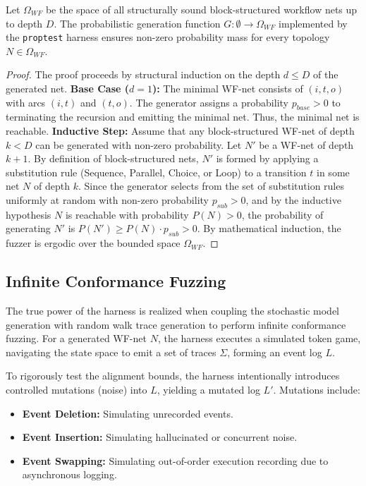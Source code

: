 \begin{theorem}
Let $\Omega_{WF}$ be the space of all structurally sound block-structured workflow nets up to depth $D$. The probabilistic generation function $G: \emptyset \rightarrow \Omega_{WF}$ implemented by the \texttt{proptest} harness ensures non-zero probability mass for every topology $N \in \Omega_{WF}$.
\end{theorem}

\begin{proof}
The proof proceeds by structural induction on the depth $d \le D$ of the generated net.
\textbf{Base Case ($d=1$):} The minimal WF-net consists of $(i, t, o)$ with arcs $(i,t)$ and $(t,o)$. The generator assigns a probability $p_{base} > 0$ to terminating the recursion and emitting the minimal net. Thus, the minimal net is reachable.
\textbf{Inductive Step:} Assume that any block-structured WF-net of depth $k < D$ can be generated with non-zero probability. Let $N'$ be a WF-net of depth $k+1$. By definition of block-structured nets, $N'$ is formed by applying a substitution rule (Sequence, Parallel, Choice, or Loop) to a transition $t$ in some net $N$ of depth $k$. Since the generator selects from the set of substitution rules uniformly at random with non-zero probability $p_{sub} > 0$, and by the inductive hypothesis $N$ is reachable with probability $P(N) > 0$, the probability of generating $N'$ is $P(N') \ge P(N) \cdot p_{sub} > 0$. By mathematical induction, the fuzzer is ergodic over the bounded space $\Omega_{WF}$.
\end{proof}

\subsection{Infinite Conformance Fuzzing}

The true power of the harness is realized when coupling the stochastic model generation with random walk trace generation to perform infinite conformance fuzzing. For a generated WF-net $N$, the harness executes a simulated token game, navigating the state space to emit a set of traces $\Sigma$, forming an event log $L$.

To rigorously test the alignment bounds, the harness intentionally introduces controlled mutations (noise) into $L$, yielding a mutated log $L'$. Mutations include:
\begin{itemize}
    \item \textbf{Event Deletion:} Simulating unrecorded events.
    \item \textbf{Event Insertion:} Simulating hallucinated or concurrent noise.
    \item \textbf{Event Swapping:} Simulating out-of-order execution recording due to asynchronous logging.
\end{itemize}

